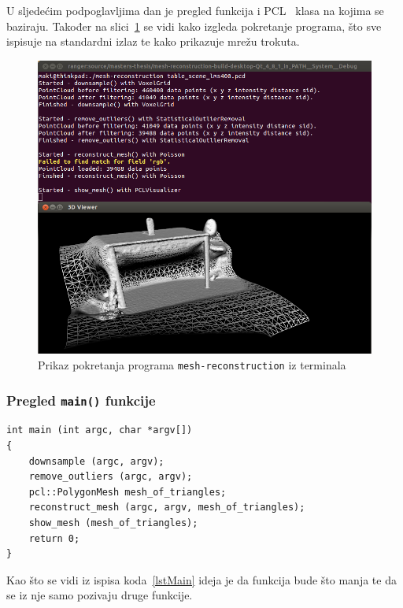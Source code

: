 U sljedećim podpoglavljima dan je pregled funkcija i PCL~\cite{pcl}
klasa na kojima se baziraju. Također na
slici~\ref{fig:running-mesh-reconstruction} se vidi kako izgleda
pokretanje programa, što sve ispisuje na standardni izlaz te kako
prikazuje mrežu trokuta.

\newpage
\setcounter{figure}{1}
\begin{figure}[h]
\centering
\includegraphics[scale=0.5]{figures/running-mesh-reconstruction.png}
\caption{Prikaz pokretanja programa \texttt{mesh-reconstruction} iz
terminala}
\label{fig:running-mesh-reconstruction}
\end{figure}

\newpage
\subsubsection{Pregled \texttt{main()} funkcije} %
\label{ssub:Pregled main funkcije}
\begin{lstlisting}[label=lstMain,caption={Izvorni kod
\texttt{main()} funkcije }]
int main (int argc, char *argv[])
{
    downsample (argc, argv);
    remove_outliers (argc, argv);
    pcl::PolygonMesh mesh_of_triangles;
    reconstruct_mesh (argc, argv, mesh_of_triangles);
    show_mesh (mesh_of_triangles);
    return 0;
}
\end{lstlisting}
Kao što se vidi iz ispisa koda~\ref{lstMain} ideja je da funkcija bude
što manja te da se iz nje samo pozivaju druge funkcije. 

